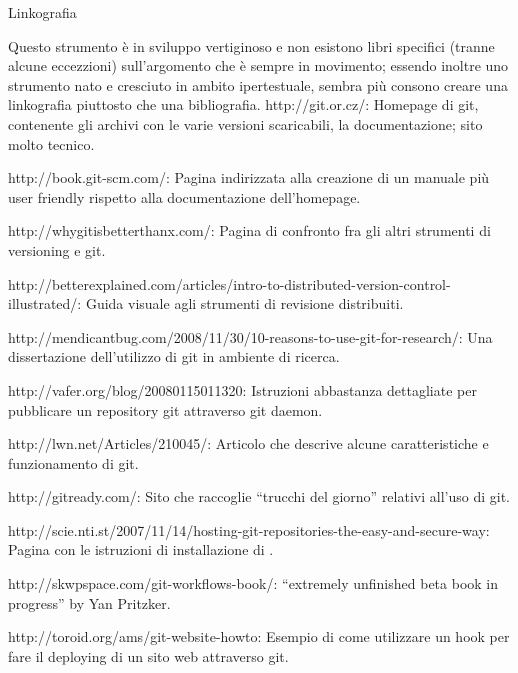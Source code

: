 \capitolo Linkografia

Questo strumento \`e in sviluppo vertiginoso e non esistono libri specifici
(tranne alcune eccezzioni) sull'argomento che \`e sempre in movimento; essendo
inoltre uno strumento nato e cresciuto in ambito ipertestuale, sembra pi\`u
consono creare una linkografia piuttosto che una bibliografia.
\bigskip
\link http://git.or.cz/: Homepage di git, contenente gli archivi con le varie
versioni scaricabili, la documentazione; sito molto tecnico.

\link http://book.git-scm.com/: Pagina indirizzata alla creazione di un manuale
pi\`u user friendly rispetto alla documentazione dell'homepage.

\link http://whygitisbetterthanx.com/: Pagina di confronto fra gli altri
strumenti di versioning e git.

\link
http://betterexplained.com/articles/intro-to-distributed-version-control-illustrated/:
Guida visuale agli strumenti di revisione distribuiti.

\link http://mendicantbug.com/2008/11/30/10-reasons-to-use-git-for-research/:
Una dissertazione dell'utilizzo di git in ambiente di ricerca.

\link http://vafer.org/blog/20080115011320:
Istruzioni abbastanza dettagliate per pubblicare un repository git attraverso
git daemon.

\link http://lwn.net/Articles/210045/: Articolo che descrive alcune
caratteristiche e funzionamento di git.

\link http://gitready.com/: Sito che raccoglie ``trucchi del giorno''
relativi all'uso di git.

\link
http://scie.nti.st/2007/11/14/hosting-git-repositories-the-easy-and-secure-way: Pagina con le istruzioni di installazione di .

\link http://skwpspace.com/git-workflows-book/: ``extremely unfinished beta book
in progress'' by Yan Pritzker.

\link http://toroid.org/ams/git-website-howto: Esempio di come utilizzare un
hook per fare il deploying di un sito web attraverso git.

\vfill\eject
